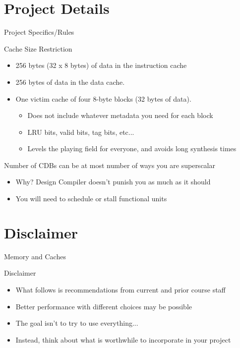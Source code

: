 \documentclass[table,dvipsnames]{beamer}
\begin{document}
\section{Project Details}
\begin{frame}{Project Specifics/Rules}
	\begin{block}{Cache Size Restriction}
		\begin{itemize}
			\item 256 bytes (32 x 8 bytes) of data in the instruction cache
			\item 256 bytes of data in the data cache.
			\item One victim cache of four 8-byte blocks (32 bytes of data).
			\begin{itemize}
				\item Does not include whatever metadata you need for each block
				\item LRU bits, valid bits, tag bits, etc... 
				\item Levels the playing field for everyone, and avoids long synthesis times
			\end{itemize}
		\end{itemize}
	\end{block}
			
	\begin{block}{Number of CDBs can be at most number of ways you are superscalar}
			\begin{itemize}
				\item Why? Design Compiler doesn't punish you as much as it should 
				\item You will need to schedule or stall functional units
			\end{itemize}
	\end{block}
\end{frame}

\section{Disclaimer}
\begin{frame}{Memory and Caches}
	\begin{block}{Disclaimer}
		\begin{itemize}
			\item {What follows is recommendations from current and prior course staff}
			\item {Better performance with different choices may be possible}
			\item {The goal isn't to try to use everything...}
			\item {Instead, think about what is worthwhile to incorporate in your project}
		\end{itemize}
	\end{block}
\end{frame}
\end{document}
